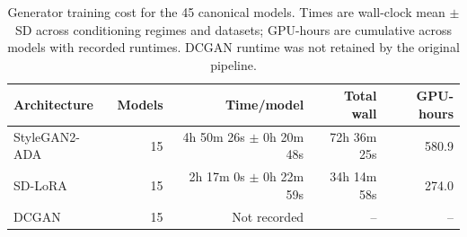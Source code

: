 \begin{table}[htbp]
\centering
\small
\setlength{\tabcolsep}{4pt}
\begin{tabular}{lrrrr}
\toprule
Architecture & Models & Time/model & Total wall & GPU-hours \\
\midrule
StyleGAN2-ADA & 15 & 4h 50m 26s $\pm$ 0h 20m 48s & 72h 36m 25s & 580.9 \\
SD-LoRA & 15 & 2h 17m 0s $\pm$ 0h 22m 59s & 34h 14m 58s & 274.0 \\
DCGAN & 15 & Not recorded & -- & -- \\
\bottomrule
\end{tabular}
\caption{Generator training cost for the 45 canonical models. Times are wall-clock mean $\pm$ SD across conditioning regimes and datasets; GPU-hours are cumulative across models with recorded runtimes. DCGAN runtime was not retained by the original pipeline.}
\label{tab:generator-training-runtime}
\end{table}
